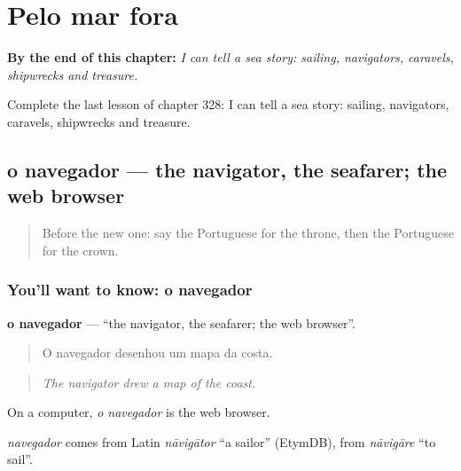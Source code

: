 
\chapter{Pelo mar fora}
\label{ch:pt-pelo-mar-fora}

\begin{chapteropening}
\textbf{By the end of this chapter:} \emph{I can tell a sea story: sailing, navigators, caravels, shipwrecks and treasure.}

Complete the last lesson of chapter 328: I can tell a sea story: sailing, navigators, caravels, shipwrecks and treasure.
\end{chapteropening}

\section[o navegador]{o navegador — the navigator, the seafarer; the web browser}

\label{lesson:PT-C328-navegador}



\begin{quote}
Before the new one: say the Portuguese for the throne, then the Portuguese for the crown.
\end{quote}

\subsection*{You'll want to know: o navegador}
\textbf{o navegador} — \textquotedblleft{}the navigator, the seafarer; the web browser\textquotedblright{}.

\begin{quote}
O navegador desenhou um mapa da costa.
\end{quote}

\begin{quote}
\emph{The navigator drew a map of the coast.}
\end{quote}

On a computer, \emph{o navegador} is the web browser.

\begin{cousinweb}
\emph{navegador} comes from Latin \emph{nāvigātor} \textquotedblleft{}a sailor\textquotedblright{} (EtymDB), from \emph{nāvigāre} \textquotedblleft{}to sail\textquotedblright{}.
\end{cousinweb}

